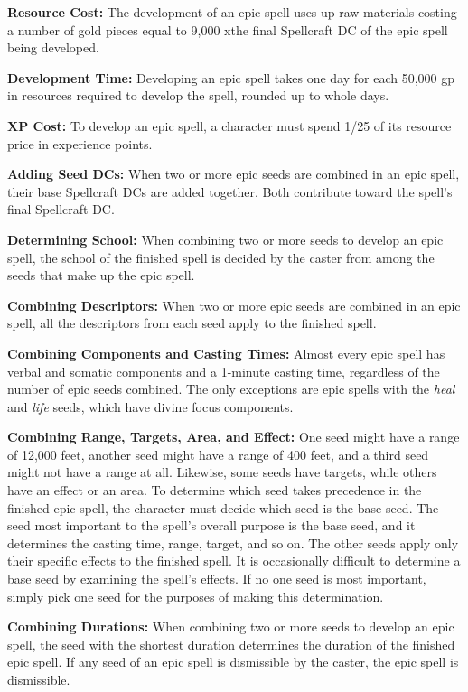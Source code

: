 \documentclass{article}
\begin{document}
\vspace{12pt}
\textbf{Resource Cost:} The development of an epic spell uses up raw materials 
costing a number of gold pieces equal to 9,000 xthe final Spellcraft DC of the 
epic spell being developed. 

\textbf{Development Time:} Developing an epic spell takes one day for each 50,000 
gp in resources required to develop the spell, rounded up to whole days. 

\textbf{XP Cost:} To develop an epic spell, a character must spend 1/25 of its 
resource price in experience points. 

\textbf{Adding Seed DCs: }When two or more epic seeds are combined in an epic spell, 
their base Spellcraft DCs are added together. Both contribute toward the spell's 
final Spellcraft DC. 

\textbf{Determining School:} When combining two or more seeds to develop an epic 
spell, the school of the finished spell is decided by the caster from among the 
seeds that make up the epic spell. 

\textbf{Combining Descriptors: }When two or more epic seeds are combined in an 
epic spell, all the descriptors from each seed apply to the finished spell. 

\textbf{Combining Components and Casting Times: }Almost every epic spell has verbal 
and somatic components and a 1-minute casting time, regardless of the number of 
epic seeds combined. The only exceptions are epic spells with the \textit{heal 
}and \textit{life }seeds, which have divine focus components. 

\textbf{Combining Range, Targets, Area, and Effect:} One seed might have a range 
of 12,000 feet, another seed might have a range of 400 feet, and a third seed might 
not have a range at all. Likewise, some seeds have targets, while others have an 
effect or an area. To determine which seed takes precedence in the finished epic 
spell, the character must decide which seed is the base seed. The seed most important 
to the spell's overall purpose is the base seed, and it determines the casting 
time, range, target, and so on. The other seeds apply only their specific effects 
to the finished spell. It is occasionally difficult to determine a base seed by 
examining the spell's effects. If no one seed is most important, simply pick one 
seed for the purposes of making this determination. 

\textbf{Combining Durations:} When combining two or more seeds to develop an epic 
spell, the seed with the shortest duration determines the duration of the finished 
epic spell. If any seed of an epic spell is dismissible by the caster, the epic 
spell is dismissible. 
\end{document}
